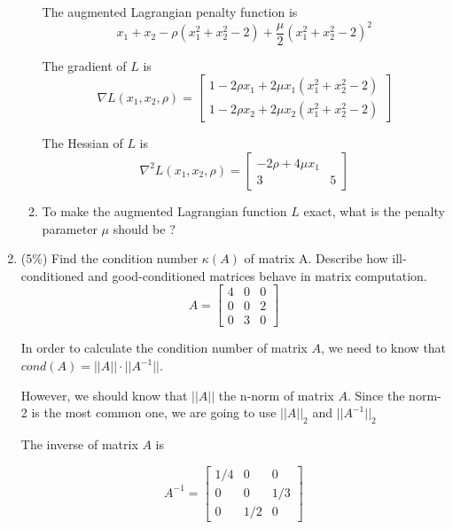 \documentclass[a4paper,10pt]{article}
\begin{document}
\begin{enumerate}
\begin{enumerate}
        {\color{blue} 
            The augmented Lagrangian penalty function is
            \[
                x_1 + x_2 - \rho (x_1^2 + x_2^2 - 2) + \frac{\mu}{2}(x_1^2 + x_2^2 - 2)^2
            \]

            The gradient of $L$ is
            \[
                \nabla L(x_1, x_2, \rho) = \begin{bmatrix}
                    1 - 2 \rho x_1 + 2 \mu x_1 (x_1^2 + x_2^2 - 2) \\
                    1 - 2 \rho x_2 + 2 \mu x_2 (x_1^2 + x_2^2 - 2)
                \end{bmatrix}
            \]

            The Hessian of $L$ is
            \[
                \nabla^2 L(x_1, x_2, \rho) = \begin{bmatrix}
                    -2 \rho + 4 \mu x_1 &  \\ 
                    3 & 5
                \end{bmatrix}
            \]
        }

        \item To make the augmented Lagrangian function $L$ exact, what is the penalty parameter $\mu$ should be ?
        {\color{blue} 

        }
    \end{enumerate}

\item (5\%) Find the condition number $\kappa(A)$ of matrix A. Describe how ill-
conditioned and good-conditioned matrices behave in matrix computation.
\[
    A = \begin{bmatrix} 4 & 0 & 0 \\0 & 0 & 2 \\0 & 3 & 0 \end{bmatrix}
\]

{\color{blue} 
In order to calculate the condition number of matrix $A$, we need to know that $cond(A) = ||A|| \cdot ||A^{-1}||$.

However, we should know that $||A||$ the n-norm of matrix $A$. Since the norm-2 is the most common one, we are going to use $||A||_2$ and $||A^{-1}||_2$ 

The inverse of matrix $A$ is

\[
    A^{-1} = \begin{bmatrix}
        1/4 & 0 & 0 \\ 0 & 0 & 1/3 \\ 0 & 1/2 & 0
    \end{bmatrix}
\]

}
\end{enumerate}
\end{document}
